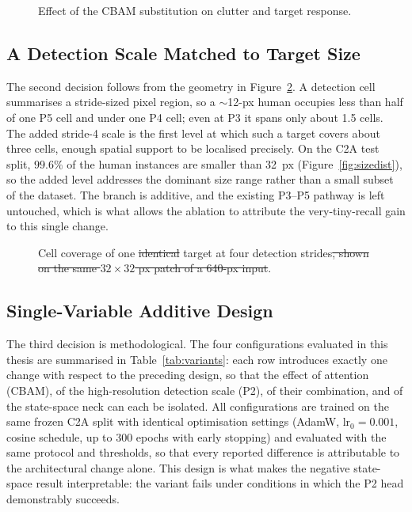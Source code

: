 \documentclass[12pt,a4paper,oneside]{report}
\providecommand{\DIFdel}[1]{{\protect\color{red}\sout{#1}}}                      %
\providecommand{\DIFdelFL}[1]{\DIFdel{#1}} %
\providecommand{\DIFaddbeginFL}{} %
\providecommand{\DIFaddendFL}{} %
\providecommand{\DIFdelbeginFL}{} %
\providecommand{\DIFdelendFL}{} %
\begin{document}
\begin{figure}[tbp]
  \centering
  \caption{Effect of the CBAM substitution on clutter and target response.}
  \label{fig:cbameffect}
\end{figure}

\subsection{A Detection Scale Matched to Target Size}
\label{sec:p2novel}
The second decision follows from the geometry in Figure~\ref{fig:strideprob}. A
detection cell summarises a stride-sized pixel region, so a $\sim$12-px human
occupies less than half of one P5 cell and under one P4 cell; even at P3 it spans
only about 1.5 cells. The added stride-4 scale is the first level at which such a
target covers about three cells, enough spatial support to be localised
precisely. On the C2A test split, $99.6\%$ of the human instances are smaller
than 32~px (Figure~\ref{fig:sizedist}), so the added level addresses the
dominant size range rather than a small subset of the dataset. The
branch is additive, and the existing P3--P5 pathway is left untouched, which is
what allows the ablation to attribute the very-tiny-recall gain to this single
change.

\begin{figure}[tbp]
  \centering
  \DIFdelbeginFL %
\DIFdelendFL \DIFaddbeginFL \caption{\DIFaddendFL Cell coverage of one \DIFdelbeginFL \DIFdelFL{identical }\DIFdelendFL target at four detection strides\DIFdelbeginFL \DIFdelFL{, shown on the same
  $32 \times 32$ px patch of a 640-px input}\DIFdelendFL .}
  \label{fig:strideprob}
\end{figure}

\subsection{Single-Variable Additive Design}
The third decision is methodological. The four configurations evaluated in this
thesis are summarised in Table~\ref{tab:variants}: each row introduces exactly
one change with respect to the preceding design, so that the effect of attention
(CBAM), of the high-resolution detection scale (P2), of their combination, and
of the state-space neck can each be isolated. All configurations are trained on
the same frozen C2A split with identical optimisation settings (AdamW,
$\text{lr}_0 = 0.001$, cosine schedule, up to 300 epochs with early stopping)
and evaluated with the same protocol and thresholds, so that every reported
difference is attributable to the architectural change alone. This design is
what makes the negative state-space result interpretable: the variant fails
under conditions in which the P2 head demonstrably succeeds.
\end{document}

